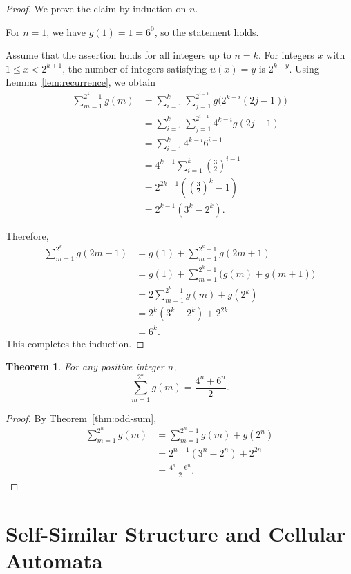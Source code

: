 \documentclass{article}
\theoremstyle{definition}
\theoremstyle{plain}
\newtheorem{theorem}[definition]{Theorem}
\theoremstyle{remark}
\begin{document}
\begin{proof}
We prove the claim by induction on $n$.

For $n=1$, we have $g(1)=1=6^0$, so the statement holds.

Assume that the assertion holds for all integers up to $n=k$.
For integers $x$ with $1\le x<2^{k+1}$, the number of integers satisfying
$u(x)=y$ is $2^{k-y}$.
Using Lemma~\ref{lem:recurrence}, we obtain
\begin{align*}
\sum_{m=1}^{2^{k}-1} g(m)
&=\sum_{i=1}^{k}\sum_{j=1}^{2^{i-1}} g\bigl(2^{k-i}(2j-1)\bigr)\\
&=\sum_{i=1}^{k}\sum_{j=1}^{2^{i-1}}4^{k-i}g(2j-1)\\
&=\sum_{i=1}^{k}4^{k-i}6^{i-1}\\
&=4^{k-1}\sum_{i=1}^{k}\left(\frac{3}{2}\right)^{i-1}\\
&=2^{2k-1}\left(\left(\frac{3}{2}\right)^k-1\right)\\
&=2^{k-1}(3^k-2^k).
\end{align*}

Therefore,
\begin{align*}
\sum_{m=1}^{2^{k}} g(2m-1)
&=g(1)+\sum_{m=1}^{2^{k}-1} g(2m+1)\\
&=g(1)+\sum_{m=1}^{2^{k}-1}\bigl(g(m)+g(m+1)\bigr)\\
&=2\sum_{m=1}^{2^{k}-1} g(m)+g(2^k)\\
&=2^{k}(3^k-2^k)+2^{2k}\\
&=6^{k}.
\end{align*}
This completes the induction.
\end{proof}

\begin{theorem}
\label{thm:total-sum}
For any positive integer $n$,
\[
\sum_{m=1}^{2^{n}} g(m)=\frac{4^{n}+6^{n}}{2}.
\]
\end{theorem}

\begin{proof}
By Theorem~\ref{thm:odd-sum},
\begin{align*}
\sum_{m=1}^{2^{n}} g(m)
&=\sum_{m=1}^{2^{n}-1} g(m)+g(2^{n})\\
&=2^{n-1}(3^{n}-2^{n})+2^{2n}\\
&=\frac{4^{n}+6^{n}}{2}.
\end{align*}
\end{proof}
\section{Self-Similar Structure and Cellular Automata}
\end{document}
